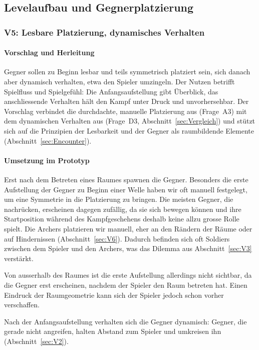 \documentclass[../Main.tex]{subfiles}
\begin{document}
\subsection{Levelaufbau und Gegnerplatzierung} \label{sec:UmsetzungLevel}

\subsubsection{V5: Lesbare Platzierung, dynamisches Verhalten} \label{sec:V5}

\paragraph{Vorschlag und Herleitung}
Gegner sollen zu Beginn lesbar und teils symmetrisch platziert sein, sich danach aber dynamisch verhalten, etwa den Spieler umzingeln. Der Nutzen betrifft Spielfluss und Spielgefühl: Die Anfangsaufstellung gibt Überblick, das anschliessende Verhalten hält den Kampf unter Druck und unvorhersehbar. Der Vorschlag verbindet die durchdachte, manuelle Platzierung aus  (Frage~A3) mit dem dynamischen Verhalten aus  (Frage~D3, Abschnitt~\ref{sec:Vergleich}) und stützt sich auf die Prinzipien der Lesbarkeit und der Gegner als raumbildende Elemente (Abschnitt~\ref{sec:Encounter}).

\paragraph{Umsetzung im Prototyp}
Erst nach dem Betreten eines Raumes spawnen die Gegner. Besonders die erste Aufstellung der Gegner zu Beginn einer Welle haben wir oft manuell festgelegt, um eine Symmetrie in die Platzierung zu bringen. Die meisten Gegner, die nachrücken, erscheinen dagegen zufällig, da sie sich bewegen können und ihre Startposition während des Kampfgeschehens deshalb keine allzu grosse Rolle spielt. Die Archers platzieren wir manuell, eher an den Rändern der Räume oder auf Hindernissen (Abschnitt~\ref{sec:V6}). Dadurch befinden sich oft Soldiers zwischen dem Spieler und den Archers, was das Dilemma aus Abschnitt~\ref{sec:V3} verstärkt.

Von ausserhalb des Raumes ist die erste Aufstellung allerdings nicht sichtbar, da die Gegner erst erscheinen, nachdem der Spieler den Raum betreten hat. Einen Eindruck der Raumgeometrie kann sich der Spieler jedoch schon vorher verschaffen.

Nach der Anfangsaufstellung verhalten sich die Gegner dynamisch: Gegner, die gerade nicht angreifen, halten Abstand zum Spieler und umkreisen ihn (Abschnitt~\ref{sec:V2}).
\end{document}
